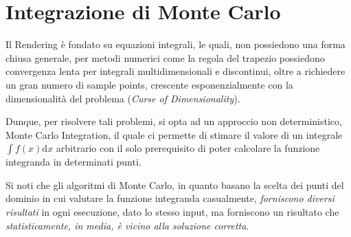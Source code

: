 \chapter{Integrazione di Monte Carlo}\label{chapter6}
Il Rendering \`e fondato su equazioni integrali, le quali, non possiedono una forma chiusa generale, per metodi numerici come la regola del trapezio
possiedono convergenza lenta per integrali multidimensionali e discontinui, oltre a richiedere un gran numero di sample points, crescente 
esponenzialmente con la dimensionalit\`a del problema (\textit{Curse of Dimensionality}).\par
Dunque, per risolvere tali problemi, si opta ad un approccio non deterministico, Monte Carlo Integration, il quale ci permette di stimare il valore 
di un integrale $\int f(x)\mathrm{d}x$ arbitrario con il solo prerequisito di poter calcolare la funzione integranda in determinati punti.\par
Si noti che gli algoritmi di Monte Carlo, in quanto basano la scelta dei punti del dominio in cui valutare la funzione integranda casualmente, 
\textit{forniscono diversi risultati} in ogni esecuzione, dato lo stesso input, ma forniscono un risultato che \textit{statisticamente, in media, 
\`e vicino alla soluzione corretta}\footnotemark{}.
